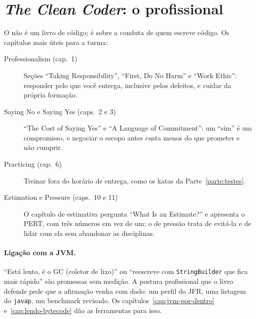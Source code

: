 \section{\emph{The Clean Coder}: o profissional}

O  não é um livro de código; é sobre a
conduta de quem escreve código. Os capítulos mais úteis para a turma:

\begin{description}
\item[Professionalism (cap.~1)] Seções \enquote{Taking Responsibility},
  \enquote{First, Do No Harm} e \enquote{Work Ethic}: responder pelo que
  você entrega, inclusive pelos defeitos, e cuidar da própria formação.
\item[Saying No e Saying Yes (caps.~2 e 3)] \enquote{The Cost of Saying
  Yes} e \enquote{A Language of Commitment}: um \enquote{sim} é um
  compromisso, e negociar o escopo antes custa menos do que prometer e
  não cumprir.
\item[Practicing (cap.~6)] Treinar fora do horário de entrega, como os
  katas da Parte~\ref{parte:testes}.
\item[Estimation e Pressure (caps.~10 e 11)] O capítulo de estimativa
  pergunta \enquote{What Is an Estimate?} e apresenta o PERT, com três
  números em vez de um; o de pressão trata de evitá-la e de lidar com
  ela sem abandonar as disciplinas.
\end{description}

\paragraph{Ligação com a JVM.}
\enquote{Está lento, é o GC (coletor de lixo)} ou \enquote{reescreve com \texttt{StringBuilder}
que fica mais rápido} são promessas sem medição. A postura profissional
que o livro defende pede que a afirmação venha com dado: um perfil do
JFR, uma listagem do \texttt{javap}, um benchmark revisado. Os
capítulos~\ref{cap:jvm-por-dentro} e~\ref{cap:lendo-bytecode} dão as
ferramentas para isso.
